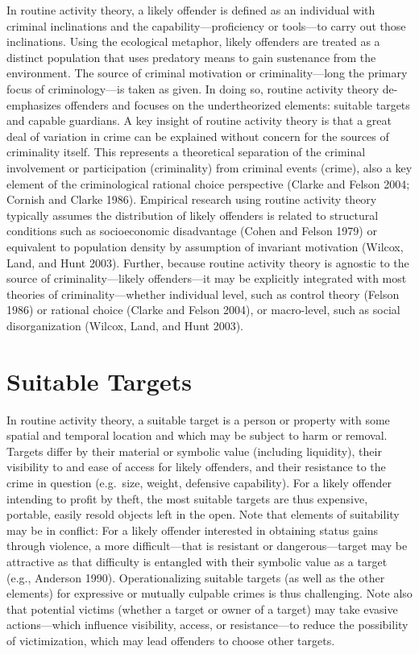 \documentclass [11pt, proquest] {uwthesis}[2015/03/03]
\begin{document}
In routine activity theory, a likely offender is defined as an individual with criminal inclinations and the capability---proficiency or tools---to carry out those inclinations. Using the ecological metaphor, likely offenders are treated as a distinct population that uses predatory means to gain sustenance from the environment. The source of criminal motivation or criminality---long the primary focus of criminology---is taken as given. In doing so, routine activity theory de-emphasizes offenders and focuses on the undertheorized elements: suitable targets and capable guardians. A key insight of routine activity theory is that a great deal of variation in crime can be explained without concern for the sources of criminality itself. This represents a theoretical separation of the criminal involvement or participation (criminality) from criminal events (crime), also a key element of the criminological rational choice perspective (Clarke and Felson 2004; Cornish and Clarke 1986). Empirical research using routine activity theory typically assumes the distribution of likely offenders is related to structural conditions such as socioeconomic disadvantage (Cohen and Felson 1979) or equivalent to population density by assumption of invariant motivation (Wilcox, Land, and Hunt 2003). Further, because routine activity theory is agnostic to the source of criminality---likely offenders---it may be explicitly integrated with most theories of criminality---whether individual level, such as control theory (Felson 1986) or rational choice (Clarke and Felson 2004), or macro-level, such as social disorganization (Wilcox, Land, and Hunt 2003).

\hypertarget{suitable-targets}{%
\section{Suitable Targets}\label{suitable-targets}}

In routine activity theory, a suitable target is a person or property with some spatial and temporal location and which may be subject to harm or removal. Targets differ by their material or symbolic value (including liquidity), their visibility to and ease of access for likely offenders, and their resistance to the crime in question (e.g.~size, weight, defensive capability). For a likely offender intending to profit by theft, the most suitable targets are thus expensive, portable, easily resold objects left in the open. Note that elements of suitability may be in conflict: For a likely offender interested in obtaining status gains through violence, a more difficult---that is resistant or dangerous---target may be attractive as that difficulty is entangled with their symbolic value as a target (e.g., Anderson 1990). Operationalizing suitable targets (as well as the other elements) for expressive or mutually culpable crimes is thus challenging. Note also that potential victims (whether a target or owner of a target) may take evasive actions---which influence visibility, access, or resistance---to reduce the possibility of victimization, which may lead offenders to choose other targets.
\end{document}
